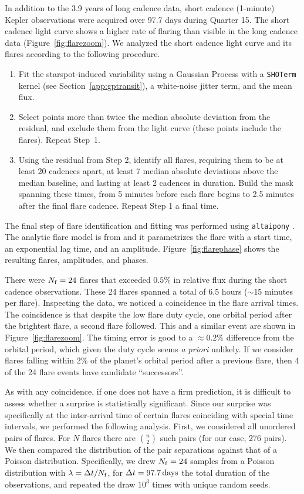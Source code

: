\documentclass[12pt,modern,twocolumn,tighten]{aastex63}
\begin{document}
In addition to the 3.9 years of long cadence data, short cadence
(1-minute) Kepler observations were acquired over 97.7 days during
Quarter 15.  The short cadence light curve shows a higher rate of
flaring than visible in the long cadence data
(Figure~\ref{fig:flarezoom}).  We analyzed the short cadence light
curve and its flares according to the following procedure.
\begin{enumerate}
  \item Fit the starspot-induced variability using a
    Gaussian Process with a \texttt{SHOTerm} kernel (see
    Section~\ref{app:gptransit}), a white-noise jitter term, and the
    mean flux.
  \item Select points more than twice the median absolute
    deviation from the residual, and exclude them from the light
    curve (these points include the flares).  Repeat Step~1.
  \item Using the residual from Step 2, identify all flares,
    requiring them to be at least 20 cadences apart, at least 7 median
    absolute deviations above the median baseline, and lasting at
    least 2 cadences in duration.  Build the mask spanning these
    times, from 5 minutes before each flare begins to 2.5 minutes
    after the final flare cadence.  Repeat Step 1 a final time.
\end{enumerate}
The final step of flare identification and fitting was performed using \texttt{altaipony}
\citep{davenport_2016,ilin_flares_2021}.  The analytic flare model is
from \citet{davenport_2014} and it parametrizes the flare with a start
time, an exponential lag time, and an amplitude.
Figure~\ref{fig:flarephase} shows the resulting flares, amplitudes,
and phases.

There were $N_{\rm f}=24$ flares that exceeded $0.5\%$ in relative
flux during the short cadence observations.  These 24 flares spanned a
total of 6.5 hours ($\sim$15 minutes per flare).  Inspecting the data,
we noticed a coincidence in the flare arrival
times.  The coincidence is that despite the low flare duty cycle, one
orbital period after the brightest flare, a second flare followed.
This and a similar event are shown in Figure~\ref{fig:flarezoom}.  The
timing error is good to a $\approx0.2\%$ difference from the orbital
period, which given the duty cycle seems {\it a priori} unlikely.  If
we consider flares falling within 2\% of the planet's orbital period
after a previous flare, then 4 of the 24 flare events have candidate
``successors''.

As with any coincidence, if one does not have a firm prediction, it is
difficult to assess whether a surprise is statistically significant.  Since
our surprise was specifically at the inter-arrival time of certain
flares coinciding with special time intervals, we performed the
following analysis.  First, we considered all unordered pairs of
flares.  For $N$ flares there are ${n \choose 2}$ such pairs (for our
case, 276 pairs).  We then compared the distribution of the pair
separations against that of a Poisson distribution.  Specifically,
we drew $N_{\rm f}=24$ samples from a Poisson distribution with
$\lambda = \Delta t / N_{\rm f}$, for $\Delta t=97.7\,{\rm days}$ the
total duration of the observations, and repeated the draw $10^3$ times with
unique random seeds.
\end{document}
